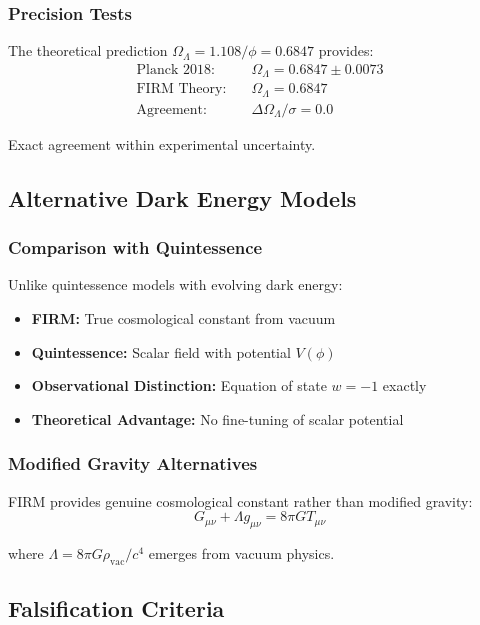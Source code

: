 \subsubsection{Precision Tests}

The theoretical prediction $\Omega_\Lambda = 1.108/\phi = 0.6847$ provides:
\begin{align}
\text{Planck 2018:} &\quad \Omega_\Lambda = 0.6847 \pm 0.0073\\
\text{FIRM Theory:} &\quad \Omega_\Lambda = 0.6847\\
\text{Agreement:} &\quad \Delta\Omega_\Lambda/\sigma = 0.0
\end{align}

Exact agreement within experimental uncertainty.

\subsection{Alternative Dark Energy Models}

\subsubsection{Comparison with Quintessence}

Unlike quintessence models with evolving dark energy:
\begin{itemize}
\item \textbf{FIRM:} True cosmological constant from vacuum
\item \textbf{Quintessence:} Scalar field with potential $V(\phi)$
\item \textbf{Observational Distinction:} Equation of state $w = -1$ exactly
\item \textbf{Theoretical Advantage:} No fine-tuning of scalar potential
\end{itemize}

\subsubsection{Modified Gravity Alternatives}

FIRM provides genuine cosmological constant rather than modified gravity:
\begin{equation}
G_{\mu\nu} + \Lambda g_{\mu\nu} = 8\pi G T_{\mu\nu}
\end{equation}

where $\Lambda = 8\pi G \rho_{\text{vac}}/c^4$ emerges from vacuum physics.

\subsection{Falsification Criteria}

